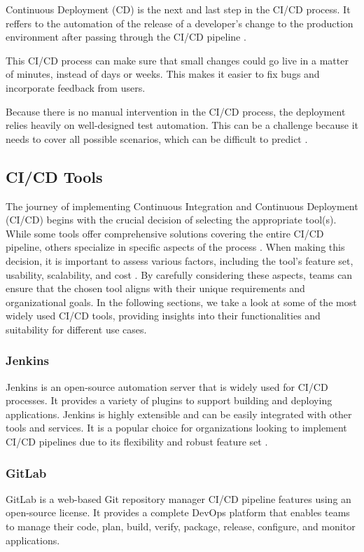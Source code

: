 Continuous Deployment (CD) is the next and last step in the CI/CD process.
It reffers to the automation of the release of a developer's change to the production environment after passing through the CI/CD pipeline \autocite{redhat}.

This CI/CD process can make sure that small changes could go live in a matter of minutes, instead of days or weeks. 
This makes it easier to fix bugs and incorporate feedback from users.

Because there is no manual intervention in the CI/CD process, the deployment relies heavily on well-designed test automation.
This can be a challenge because it needs to cover all possible scenarios, which can be difficult to predict \autocite{redhat}.

\subsection{CI/CD Tools}
The journey of implementing Continuous Integration and Continuous Deployment (CI/CD) begins with the crucial decision of selecting the appropriate tool(s). 
While some tools offer comprehensive solutions covering the entire CI/CD pipeline, others specialize in specific aspects of the process \autocite{redhat}. 
When making this decision, it is important to assess various factors, including the tool's feature set, usability, scalability, and cost \autocite{synopsys}. 
By carefully considering these aspects, teams can ensure that the chosen tool aligns with their unique requirements and organizational goals.
In the following sections, we take a look at some of the most widely used CI/CD tools, providing insights into their functionalities and suitability for different use cases.

\subsubsection{Jenkins}
Jenkins is an open-source automation server that is widely used for CI/CD processes. It provides a variety of plugins to support building and deploying applications. 
Jenkins is highly extensible and can be easily integrated with other tools and services. 
It is a popular choice for organizations looking to implement CI/CD pipelines due to its flexibility and robust feature set \autocite{redhat}.

\subsubsection{GitLab}
GitLab is a web-based Git repository manager CI/CD pipeline features using an open-source license.
It provides a complete DevOps platform that enables teams to manage their code, plan, build, verify, package, release, configure, and monitor applications.

